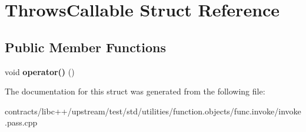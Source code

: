 \hypertarget{struct_throws_callable}{}\section{Throws\+Callable Struct Reference}
\label{struct_throws_callable}
\subsection*{Public Member Functions}
\begin{DoxyCompactItemize}
\item 
\mbox{\label{struct_throws_callable_ae79d525b62045b1887b5c482265bfd0e}} 
void {\bfseries operator()} ()
\end{DoxyCompactItemize}


The documentation for this struct was generated from the following file\+:\begin{DoxyCompactItemize}
\item 
contracts/libc++/upstream/test/std/utilities/function.\+objects/func.\+invoke/invoke.\+pass.\+cpp\end{DoxyCompactItemize}
